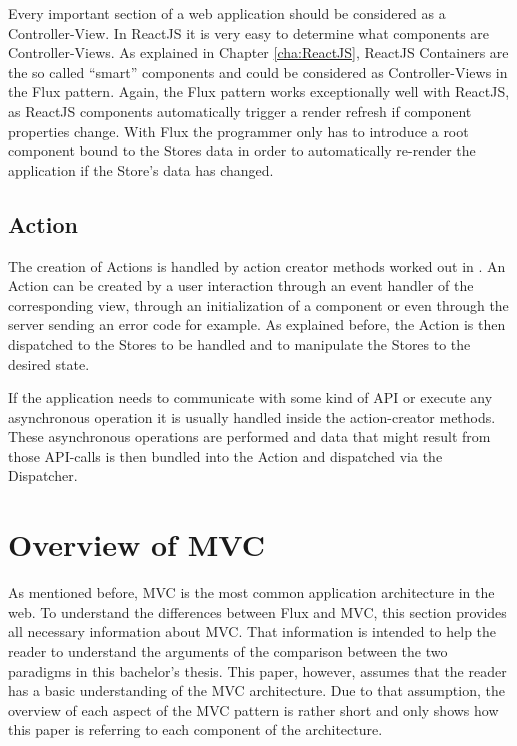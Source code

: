 Every important section of a web application should be considered as a Controller-View. In ReactJS it is very easy to determine what components are Controller-Views. As explained in Chapter \ref{cha:ReactJS}, ReactJS Containers are the so called \enquote{smart} components and could be considered as Controller-Views in the Flux pattern. Again, the Flux pattern works exceptionally well with ReactJS, as ReactJS components automatically trigger a render refresh if component properties change. With Flux the programmer only has to introduce a root component bound to the Stores data in order to automatically re-render the application if the Store's data has changed.

\subsection{Action} \label{ssec:fluxaction}

The creation of Actions is handled by action creator methods worked out in \cite[structure-and-data-flow, actions]{FacebookInc.2014}. An Action can be created by a user interaction through an event handler of the corresponding view, through an initialization of a component or even through the server sending an error code for example. As explained before, the Action is then dispatched to the Stores to be handled and to manipulate the Stores to the desired state.

If the application needs to communicate with some kind of API or execute any asynchronous operation it is usually handled inside the action-creator methods. These asynchronous operations are performed and data that might result from those API-calls is then bundled into the Action and dispatched via the Dispatcher.

\section{Overview of MVC}


As mentioned before, MVC is the most common application architecture in the web. To understand the differences between Flux and MVC, this section provides all necessary information about MVC. That information is intended to help the reader to understand the arguments of the comparison between the two paradigms in this bachelor's thesis. This paper, however, assumes that the reader has a basic understanding of the MVC architecture. Due to that assumption, the overview of each aspect of the MVC pattern is rather short and only shows how this paper is referring to each component of the architecture.

